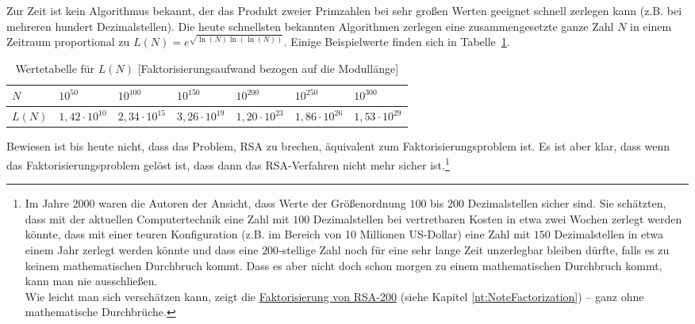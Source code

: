 \begin{refsegment}
Zur Zeit ist kein Algorithmus bekannt, der das Produkt zweier Primzahlen bei sehr großen
Werten geeignet schnell zerlegen kann (z.B. bei mehreren hundert Dezimalstellen). Die
heute schnellsten bekannten Algorithmen \cite{Stin2006} zerlegen eine zusammengesetzte
ganze Zahl $ N $ in einem Zeitraum proportional zu $ L(N)= e^{\sqrt{\ln (N) \ln (\ln (N))}}.$
Einige Beispielwerte finden sich in Tabelle~\ref{lnvalues}.
\begin{table}[ht]
\begin{center}
\begin{tabular}{|l||l|l|l|l|l|l|}\hline
$N$ & $ 10^{50} $ & $ 10^{100} $ & $ 10^{150} $ & $ 10^{200} $ & $ 10^{250} $ & $ 10^{300} $\\ \hline
$L(N)$ & $ 1,42 \cdot 10^{10} $ &  $ 2,34  \cdot 10^{15} $ &  $ 3,26 \cdot 10^{19} $ &  $ 1,20 \cdot 10^{23} $ &  $ 1,86 \cdot 10^{26} $ &  $ 1,53 \cdot 10^{29} $\\ \hline
\end{tabular}
\end{center}
\caption{Wertetabelle für $L(N)$ [Faktorisierungsaufwand bezogen auf die Modullänge]}
\label{lnvalues}
\end{table}

Bewiesen ist bis heute nicht, dass das Problem, RSA zu brechen, äquivalent zum
Faktorisierungsproblem  ist. Es ist
aber klar, dass wenn das Faktorisierungsproblem \glqq gelöst\grqq {} ist, dass
dann das RSA-Verfahren nicht mehr sicher ist.\footnote{%
Im Jahre 2000 waren die Autoren der Ansicht, dass Werte der
Größenordnung $ 100 $ bis $ 200 $ Dezimalstellen sicher sind. Sie schätzten,
dass mit der aktuellen Computertechnik eine Zahl mit $100$
Dezimalstellen bei vertretbaren Kosten in etwa zwei Wochen zerlegt werden
könnte, dass mit einer teuren Konfiguration (z.B. im Bereich von 10 Millionen
US-Dollar) eine Zahl mit $150$ Dezimalstellen in etwa einem Jahr zerlegt
werden könnte und dass eine $200$-stellige Zahl noch für eine sehr lange Zeit
unzerlegbar bleiben dürfte, falls es zu keinem mathematischen Durchbruch kommt.
Dass es aber nicht doch schon morgen zu einem mathematischen Durchbruch kommt,
kann man nie ausschließen.\\
Wie leicht man sich verschätzen kann, zeigt die
\hyperlink{RSA-200-chap3}{Faktorisierung von RSA-200}
(siehe Kapitel \ref{nt:NoteFactorization}) -- ganz ohne \glqq mathematische
Durchbrüche\grqq.}




\end{refsegment}
